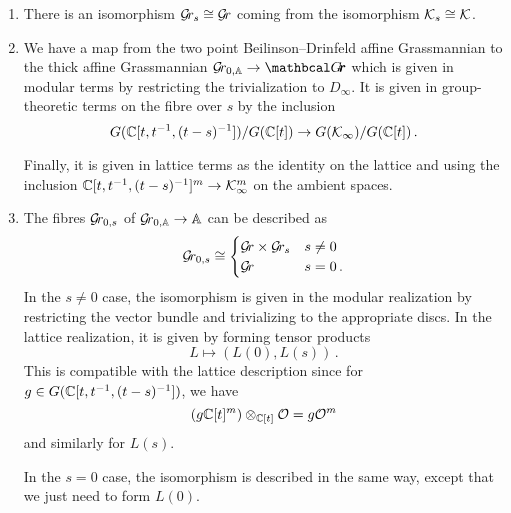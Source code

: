 \documentclass[draft]{article}
\begin{document}
\begin{enumerate}
    \item There is an isomorphism $ \mathcal{G}\!r_s \cong \mathcal{G}\!r $ coming from the isomorphism $ \mathcal K_s \cong \mathcal K$.
    \item We have a map from the two point Beilinson--Drinfeld affine Grassmannian to the thick affine Grassmannian $ \Grbd \rightarrow \Grth $
    which is given in modular terms by restricting the trivialization to $ D_\infty$.  It is given in group-theoretic terms on the fibre over $ s $ by the inclusion
    $$
    G(\mathbb C[t, t^{-1}, (t-s)^{-1}])/ G(\mathbb C[t]) \rightarrow G(\mathcal K_\infty)/G(\mathbb C[t])\,. 
    $$
    
    Finally, it is given in lattice terms as the identity on the lattice and using the inclusion $\mathbb C[t, t^{-1}, (t-s)^{-1}]^m \rightarrow \mathcal K_\infty^m$ on the ambient spaces.
    \item The fibres $ \mathcal{G}\!r_{0,s}$ of $ {\mathcal{G}\!r_{0,\mathbb A}} \rightarrow \mathbb A$ can be described as %
    $$
    \mathcal{G}\!r_{0,s} \cong 
    \begin{cases} 
        \mathcal{G}\!r \times \mathcal{G}\!r_s & s \ne 0 \\
        \mathcal{G}\!r              & s = 0\,.
    \end{cases}
    $$
    In the $s\ne 0$ case, the isomorphism is given in the modular realization by restricting the vector bundle and trivializing to the appropriate discs.  
    In the lattice realization, it is given by forming tensor products 
    $$
    L \mapsto (L(0), L(s))\,.
    $$
    This is compatible with the lattice description since for $ g \in G(\mathbb C[t, t^{-1}, (t-s)^{-1}]) $, we have
    $$
    \left( g \mathbb C[t]^m \right) \otimes_{\mathbb C[t]} \mathcal O = g \mathcal O^m
    $$
    and similarly for $ L(s)$.
    
    In the $ s = 0 $ case, the isomorphism is described in the same way, except that we just need to form $ L(0)$.
    
    
\end{enumerate}
\end{document}
